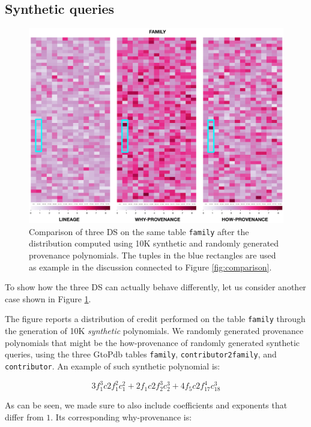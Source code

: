 \subsection{Synthetic queries}

\begin{figure}[tb]
  \includegraphics[width=1\textwidth]{figures/synthetic_polynomials}
  \caption{Comparison of three DS on the same table \texttt{family} after the distribution computed using 10K synthetic and randomly generated provenance polynomials. The tuples in the blue rectangles are used as example in the discussion connected to Figure \ref{fig:comparison}.}
  \label{figure:comparison_on_synthetic_polynomials_2}
\end{figure}

To show how the three DS can actually behave differently, let us consider another case shown in Figure \ref{figure:comparison_on_synthetic_polynomials_2}. 


The figure reports a distribution of credit performed on the table \texttt{family} through the generation of 10K \emph{synthetic} polynomials. 
We randomly generated provenance polynomials that might be the how-provenance of randomly generated synthetic queries, using the three GtoPdb tables \texttt{family}, \texttt{contributor2family}, and \texttt{contributor}. 
An example of such synthetic polynomial is:

{\footnotesize
\[
3 f_1^3 c2f_1^2 c_1^2 + 2 f_1 c2f_2^3 c_2^3 + 4 f_5 c2f_{17}^4 c_{18}^3
\] }

As can be seen, we made sure to also include coefficients and exponents that differ from $1$.
Its corresponding why-provenance is: 

